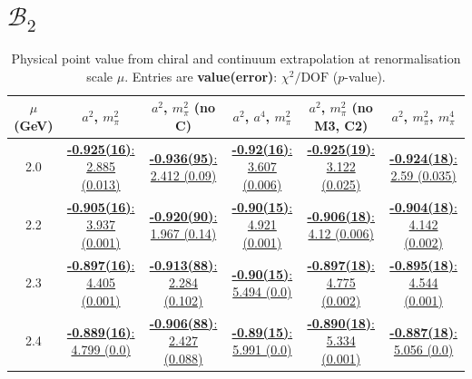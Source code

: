 \documentclass[12pt]{extarticle}
\begin{document}
\section{$\mathcal{B}_2$}
\begin{table}[h!]
\begin{center}
\begin{tabular}{|c|c|c|c|c|c|}
\hline
$\mu$ (GeV) & $a^2$, $m_\pi^2$& $a^2$, $m_\pi^2$ (no C)& $a^2$, $a^4$, $m_\pi^2$& $a^2$, $m_\pi^2$ (no M3, C2)& $a^2$, $m_\pi^2$, $m_\pi^4$\\
\hline
2.0& \hyperlink{VVmAA/SUSY/a2m2_20.pdf.1}{\textbf{-0.925(16)}: 2.885 (0.013)} & \hyperlink{VVmAA/SUSY/a2m2noC_20.pdf.1}{\textbf{-0.936(95)}: 2.412 (0.09)} & \hyperlink{VVmAA/SUSY/a2a4m2_20.pdf.1}{\textbf{-0.92(16)}: 3.607 (0.006)} & \hyperlink{VVmAA/SUSY/a2m2mcut_20.pdf.1}{\textbf{-0.925(19)}: 3.122 (0.025)} & \hyperlink{VVmAA/SUSY/a2m2m4_20.pdf.1}{\textbf{-0.924(18)}: 2.59 (0.035)}\\
2.2& \hyperlink{VVmAA/SUSY/a2m2_22.pdf.1}{\textbf{-0.905(16)}: 3.937 (0.001)} & \hyperlink{VVmAA/SUSY/a2m2noC_22.pdf.1}{\textbf{-0.920(90)}: 1.967 (0.14)} & \hyperlink{VVmAA/SUSY/a2a4m2_22.pdf.1}{\textbf{-0.90(15)}: 4.921 (0.001)} & \hyperlink{VVmAA/SUSY/a2m2mcut_22.pdf.1}{\textbf{-0.906(18)}: 4.12 (0.006)} & \hyperlink{VVmAA/SUSY/a2m2m4_22.pdf.1}{\textbf{-0.904(18)}: 4.142 (0.002)}\\
2.3& \hyperlink{VVmAA/SUSY/a2m2_23.pdf.1}{\textbf{-0.897(16)}: 4.405 (0.001)} & \hyperlink{VVmAA/SUSY/a2m2noC_23.pdf.1}{\textbf{-0.913(88)}: 2.284 (0.102)} & \hyperlink{VVmAA/SUSY/a2a4m2_23.pdf.1}{\textbf{-0.90(15)}: 5.494 (0.0)} & \hyperlink{VVmAA/SUSY/a2m2mcut_23.pdf.1}{\textbf{-0.897(18)}: 4.775 (0.002)} & \hyperlink{VVmAA/SUSY/a2m2m4_23.pdf.1}{\textbf{-0.895(18)}: 4.544 (0.001)}\\
2.4& \hyperlink{VVmAA/SUSY/a2m2_24.pdf.1}{\textbf{-0.889(16)}: 4.799 (0.0)} & \hyperlink{VVmAA/SUSY/a2m2noC_24.pdf.1}{\textbf{-0.906(88)}: 2.427 (0.088)} & \hyperlink{VVmAA/SUSY/a2a4m2_24.pdf.1}{\textbf{-0.89(15)}: 5.991 (0.0)} & \hyperlink{VVmAA/SUSY/a2m2mcut_24.pdf.1}{\textbf{-0.890(18)}: 5.334 (0.001)} & \hyperlink{VVmAA/SUSY/a2m2m4_24.pdf.1}{\textbf{-0.887(18)}: 5.056 (0.0)}\\
\hline
\end{tabular}
\caption{Physical point value from chiral and continuum extrapolation at renormalisation scale $\mu$. Entries are \textbf{value(error)}: $\chi^2/\text{DOF}$ ($p$-value).}
\end{center}
\end{table}
\end{document}
